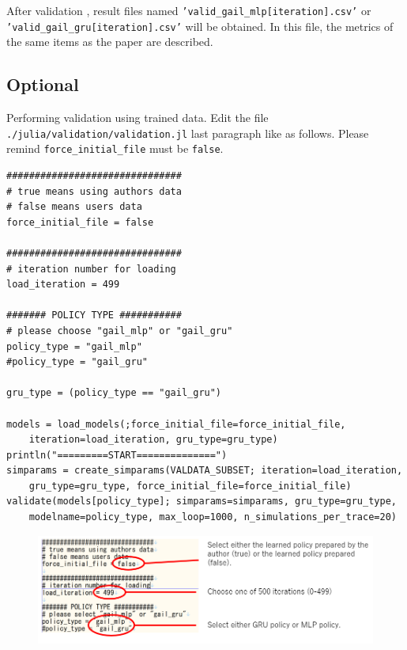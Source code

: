 \documentclass[openany,11pt]{report}%
\begin{document}
After validation , result files named {\tt 'valid\_gail\_mlp[iteration].csv'} or {\tt 'valid\_gail\_gru[iteration].csv'} will be obtained.
In this file, the metrics of the same items as the paper are described.

\begin{landscape}
\subsection{Optional}

Performing validation using trained data.
Edit the file {\tt ./julia/validation/validation.jl} last paragraph like as follows.
Please remind {\tt force\_initial\_file} must be {\tt false}. 

\begin{lstlisting}[style=DOS]
###############################
# true means using authors data
# false means users data
force_initial_file = false

###############################
# iteration number for loading
load_iteration = 499

####### POLICY TYPE ###########
# please choose "gail_mlp" or "gail_gru"
policy_type = "gail_mlp"
#policy_type = "gail_gru"

gru_type = (policy_type == "gail_gru")

models = load_models(;force_initial_file=force_initial_file, 
    iteration=load_iteration, gru_type=gru_type)
println("=========START==============")
simparams = create_simparams(VALDATA_SUBSET; iteration=load_iteration, 
    gru_type=gru_type, force_initial_file=force_initial_file)
validate(models[policy_type]; simparams=simparams, gru_type=gru_type, 
    modelname=policy_type, max_loop=1000, n_simulations_per_trace=20)
\end{lstlisting}
\end{landscape}


\begin{figure}[h]
    \centering
    \includegraphics[width=\textwidth]{img/example_change.png}
    \label{fig:initialvalues}
\end{figure}
\end{document}
